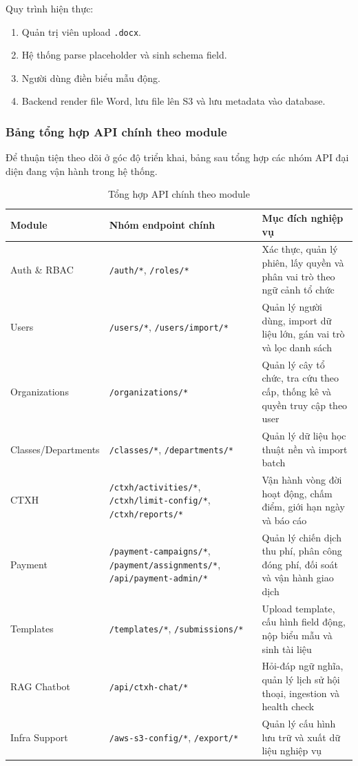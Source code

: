 Quy trình hiện thực:
\begin{enumerate}
	\item Quản trị viên upload \texttt{.docx}.
	\item Hệ thống parse placeholder và sinh schema field.
	\item Người dùng điền biểu mẫu động.
	\item Backend render file Word, lưu file lên S3 và lưu metadata vào database.
\end{enumerate}

\subsubsection{Bảng tổng hợp API chính theo module}
Để thuận tiện theo dõi ở góc độ triển khai, bảng sau tổng hợp các nhóm API đại diện đang vận hành trong hệ thống.

\begin{table}[H]
\centering
\renewcommand{\arraystretch}{1.2}
\small
\begin{tabular}{|p{3.2cm}|p{5.5cm}|p{6.3cm}|}
\hline
\textbf{Module} & \textbf{Nhóm endpoint chính} & \textbf{Mục đích nghiệp vụ} \\
\hline
Auth \& RBAC & \texttt{/auth/*}, \texttt{/roles/*} & Xác thực, quản lý phiên, lấy quyền và phân vai trò theo ngữ cảnh tổ chức \\
\hline
Users & \texttt{/users/*}, \texttt{/users/import/*} & Quản lý người dùng, import dữ liệu lớn, gán vai trò và lọc danh sách \\
\hline
Organizations & \texttt{/organizations/*} & Quản lý cây tổ chức, tra cứu theo cấp, thống kê và quyền truy cập theo user \\
\hline
Classes/Departments & \texttt{/classes/*}, \texttt{/departments/*} & Quản lý dữ liệu học thuật nền và import batch \\
\hline
CTXH & \texttt{/ctxh/activities/*}, \texttt{/ctxh/limit-config/*}, \texttt{/ctxh/reports/*} & Vận hành vòng đời hoạt động, chấm điểm, giới hạn ngày và báo cáo \\
\hline
Payment & \texttt{/payment-campaigns/*}, \texttt{/payment/assignments/*}, \texttt{/api/payment-admin/*} & Quản lý chiến dịch thu phí, phân công đóng phí, đối soát và vận hành giao dịch \\
\hline
Templates & \texttt{/templates/*}, \texttt{/submissions/*} & Upload template, cấu hình field động, nộp biểu mẫu và sinh tài liệu \\
\hline
RAG Chatbot & \texttt{/api/ctxh-chat/*} & Hỏi-đáp ngữ nghĩa, quản lý lịch sử hội thoại, ingestion và health check \\
\hline
Infra Support & \texttt{/aws-s3-config/*}, \texttt{/export/*} & Quản lý cấu hình lưu trữ và xuất dữ liệu nghiệp vụ \\
\hline
\end{tabular}
\caption{Tổng hợp API chính theo module}
\end{table}

